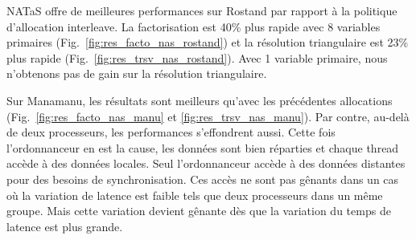 NATaS offre de meilleures performances sur Rostand par rapport à la politique d'allocation interleave.
%
La factorisation est 40\% plus rapide avec 8 variables primaires (Fig.~\ref{fig:res_facto_nas_rostand}) et la résolution triangulaire est 23\% plus rapide (Fig.~\ref{fig:res_trsv_nas_rostand}).
%
Avec 1 variable primaire, nous n'obtenons pas de gain sur la résolution triangulaire.


Sur Manamanu, les résultats sont meilleurs qu'avec les précédentes allocations (Fig.~\ref{fig:res_facto_nas_manu} et \ref{fig:res_trsv_nas_manu}).
%
Par contre, au-delà de deux processeurs, les performances s'effondrent aussi.
%
Cette fois l'ordonnanceur en est la cause, les données sont bien réparties et chaque thread accède à des données locales.
%
Seul l'ordonnanceur accède à des données distantes pour des besoins de synchronisation.
%
Ces accès ne sont pas gênants dans un cas où la variation de latence est faible tels que deux processeurs dans un même groupe.
%
Mais cette variation devient gênante dès que la variation du temps de latence est plus grande.
